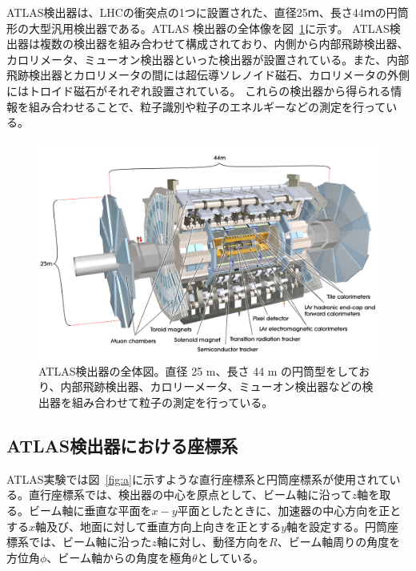 ATLAS検出器は、LHCの衝突点の1つに設置された、直径25ｍ、長さ44ｍの円筒形の大型汎用検出器である\cite{Aad:1129811}。ATLAS 検出器の全体像を図~\ref{fig:ATLAS検出器}に示す。
ATLAS検出器は複数の検出器を組み合わせて構成されており、内側から内部飛跡検出器、カロリメータ、ミューオン検出器といった検出器が設置されている。また、内部飛跡検出器とカロリメータの間には超伝導ソレノイド磁石、カロリメータの外側にはトロイド磁石がそれぞれ設置されている。
これらの検出器から得られる情報を組み合わせることで、粒子識別や粒子のエネルギーなどの測定を行っている。

\begin{figure}[tb]
  \centering
  \includegraphics[clip,width=12cm]{fig/2/0803012_01.jpg}
  \caption{ATLAS検出器の全体図\cite{Aad:1129811}。直径 25 m、長さ 44 m の円筒型をしており、内部飛跡検出器、カロリーメータ、ミューオン検出器などの検出器を組み合わせて粒子の測定を行っている。}
  \label{fig:ATLAS検出器}
\end{figure}

\subsection{ATLAS検出器における座標系}
ATLAS実験では図~\ref{fig:a}に示すような直行座標系と円筒座標系が使用されている。直行座標系では、検出器の中心を原点として、ビーム軸に沿って$z$軸を取る。ビーム軸に垂直な平面を$x-y$平面としたときに、加速器の中心方向を正とする$x$軸及び、地面に対して垂直方向上向きを正とする$y$軸を設定する。円筒座標系では、ビーム軸に沿った$z$軸に対し、動径方向を$R$、ビーム軸周りの角度を方位角$\phi$、ビーム軸からの角度を極角$\theta$としている。

